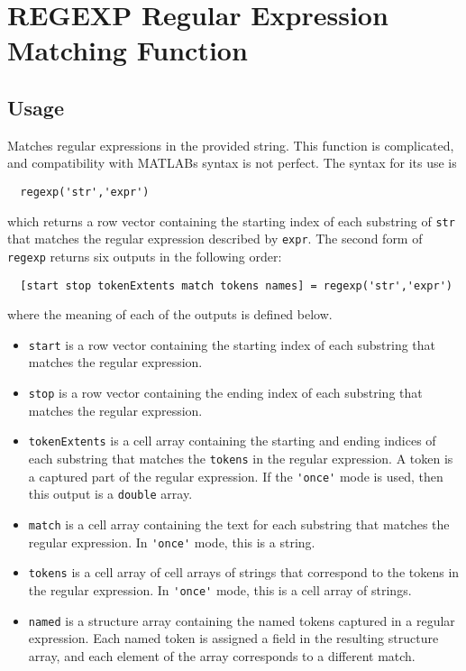 \section{REGEXP Regular Expression Matching Function}

\subsection{Usage}

Matches regular expressions in the provided string.  This function is
complicated, and compatibility with MATLABs syntax is not perfect.  The
syntax for its use is
\begin{verbatim}
  regexp('str','expr')
\end{verbatim}
which returns a row vector containing the starting index of each substring
of \verb|str| that matches the regular expression described by \verb|expr|.  The
second form of \verb|regexp| returns six outputs in the following order:
\begin{verbatim}
  [start stop tokenExtents match tokens names] = regexp('str','expr')
\end{verbatim}
where the meaning of each of the outputs is defined below.
\begin{itemize}
\item  \verb|start| is a row vector containing the starting index of each 
substring that matches the regular expression.

\item  \verb|stop| is a row vector containing the ending index of each 
substring that matches the regular expression.

\item  \verb|tokenExtents| is a cell array containing the starting and ending
indices of each substring that matches the \verb|tokens| in the regular
expression.  A token is a captured part of the regular expression.
If the \verb|'once'| mode is used, then this output is a \verb|double| array.

\item  \verb|match| is a cell array containing the text for each substring
that matches the regular expression.  In \verb|'once'| mode, this is a 
string.

\item  \verb|tokens| is a cell array of cell arrays of strings that correspond
to the tokens in the regular expression.  In \verb|'once'| mode, this is a
cell array of strings.

\item  \verb|named| is a structure array containing the named tokens captured
in a regular expression. Each named token is assigned a field in the resulting
structure array, and each element of the array corresponds to a different
match.

\end{itemize}
